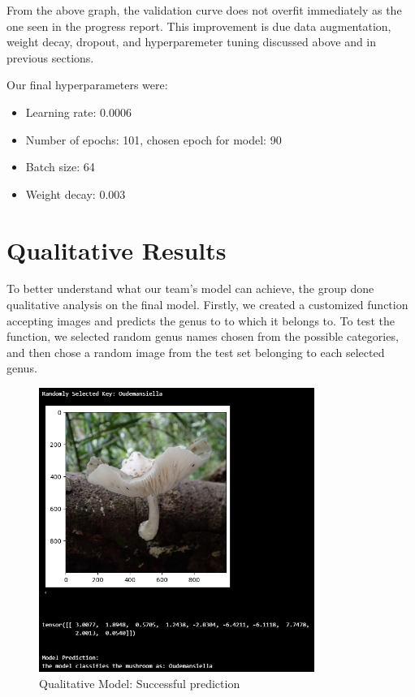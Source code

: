 \documentclass{article} %
\begin{document}
From the above graph, the validation curve does not overfit immediately as the one seen in the progress report. This improvement is due data augmentation, weight decay, dropout, and hyperparemeter tuning discussed above and in previous sections. 

Our final hyperparameters were:
\begin{itemize}
    \item Learning rate: 0.0006
    \item Number of epochs: 101, chosen epoch for model: 90
    \item Batch size: 64
    \item Weight decay: 0.003
\end{itemize}

\section{Qualitative Results}
\label{sec:qualitative_results}

To better understand what our team's model can achieve, the group done qualitative analysis on the final model. Firstly, we created a customized function accepting images and predicts the genus to to which it belongs to. To test the function, we selected random genus names chosen from the possible categories, and then chose a random image from the test set belonging to each selected genus.

\FloatBarrier
\begin{figure}[h]
    \begin{center}
    \includegraphics[width=0.8\textwidth]{figures/qualitativeResultImg1.png}
    \end{center}
    \caption{Qualitative Model: Successful prediction}
    \label{fig:goodPrediction}
\end{figure}
\FloatBarrier
\end{document}
